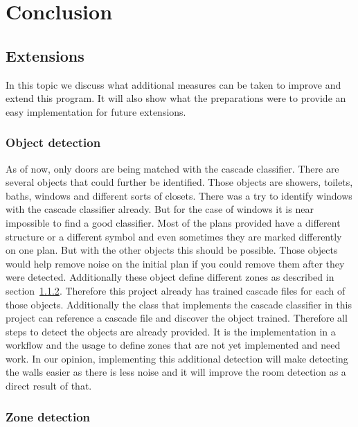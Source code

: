 \section{Conclusion}
\subsection{Extensions}
In this topic we discuss what additional measures can be taken to improve and extend this program. It will also show what the preparations were to provide an easy implementation for future extensions.

\subsubsection{Object detection}
As of now, only doors are being matched with the cascade classifier. There are several objects that could further be identified. Those objects are showers, toilets, baths, windows and different sorts of closets.
There was a try to identify windows with the cascade classifier already. But for the case of windows it is near impossible to find a good classifier. Most of the plans provided have a different structure or a different symbol and even sometimes they are marked differently on one plan. But with the other objects this should be possible. Those objects would help remove noise on the initial plan if you could remove them after they were detected. Additionally these object define different zones as described in section~\ref{sub:ZoneDetection}. Therefore this project already has trained cascade files for each of those objects. Additionally the class that implements the cascade classifier in this project can reference a cascade file and discover the object trained. Therefore all steps to detect the objects are already provided. It is the implementation in a workflow and the usage to define zones that are not yet implemented and need work. In our opinion, implementing this additional detection will make detecting the walls easier as there is less noise and it will improve the room detection as a direct result of that.

\subsubsection{Zone detection}
\label{sub:ZoneDetection}

